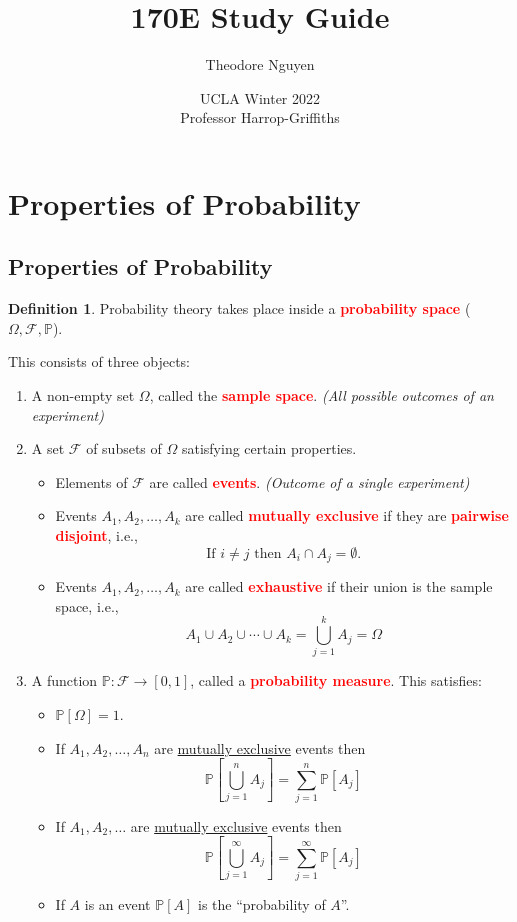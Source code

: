\documentclass{article}
\title{170E Study Guide}
\author{Theodore Nguyen}
\date{UCLA Winter 2022 \\ Professor Harrop-Griffiths}
\newcommand{\PP}{\mathbb{P}}
\newcommand{\bfred}[1]{\textcolor{red}{\textbf{#1}}}
\theoremstyle{plain}
\theoremstyle{definition}
\newtheorem{defn}{Definition}[section]
\theoremstyle{remark}
\begin{document}
\maketitle

\tableofcontents

\section{Properties of Probability}
\subsection{Properties of Probability}

\begin{defn}
    Probability theory takes place inside a \bfred{probability space} ($\Omega, \mathcal{F}, \PP$).
    
    \noindent This consists of three objects:
    \begin{enumerate}[1.]
        \item A non-empty set $\Omega$, called the \bfred{sample space}. \emph{(All possible outcomes of an experiment)}
        \item A set $\mathcal{F}$ of subsets of $\Omega$ satisfying certain properties.
        \begin{itemize}
            \item Elements of $\mathcal{F}$ are called \bfred{events}. \emph{(Outcome of a single experiment)}
            \item Events $A_1, A_2, \dotsc, A_k$ are called \bfred{mutually exclusive} if they are \bfred{pairwise disjoint}, i.e., \[\text{If $i \neq j$ then $A_i \cap A_j = \emptyset$}.\]
            \item Events $A_1, A_2, \dotsc, A_k$ are called \bfred{exhaustive} if their union is the sample space, i.e., \[A_1 \cup A_2 \cup \dotsb \cup A_k = \bigcup_{j=1}^kA_j = \Omega\]
        \end{itemize}
        \item A function $\PP: \mathcal{F} \rightarrow [0, 1]$, called a \bfred{probability measure}. This satisfies:
        \begin{itemize}
            \item $\PP[\Omega] = 1$.
            \item If $A_1, A_2, \dotsc, A_n$ are \underline{mutually exclusive} events then \[\PP\left[\bigcup_{j=1}^nA_j\right] = \sum_{j=1}^n\PP[A_j]\]
            \item If $A_1, A_2, \dotsc$ are \underline{mutually exclusive} events then \[\PP\left[\bigcup_{j=1}^\infty A_j\right] = \sum_{j=1}^\infty \PP[A_j]\]
            \item If $A$ is an event $\PP[A]$ is the ``probability of $A$''.
        \end{itemize}
    \end{enumerate}
\end{defn}
\end{document}

